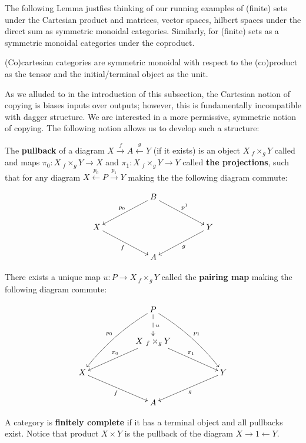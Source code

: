 The following Lemma justfies thinking of our running  examples of (finite) sets under the Cartesian product and matrices, vector spaces, hilbert spaces under the direct sum as symmetric monoidal categories.  Similarly, for (finite) sets as a symmetric monoidal categories under the coproduct.

\begin{lemma}
(Co)cartesian categories are symmetric monoidal with respect to the (co)product as the tensor and the initial/terminal object as the unit.
\end{lemma}




As we alluded to in the introduction of this subsection, the Cartesian notion of copying is biases inputs over outputs; however, this is fundamentally incompatible with dagger structure.  We are interested in a more permissive, symmetric notion of copying. The following notion allows us to develop such a structure:


\begin{definition}
The {\bf pullback} of a diagram  $X \xrightarrow{f} A \xleftarrow{g} Y$ (if it exists) is an object $X\ {}_f \times_{g} Y$ called and maps $\pi_0:X\ {}_f \times_{g} Y\to X$ and  $\pi_1:X\ {}_f \times_{g} Y\to Y$ called {\bf the  projections}, such that for any diagram $X \xleftarrow{p_0} P \xrightarrow{p_1} Y$ making the the following diagram commute:

$$
\xymatrix{
    &
    & B   \ar[dll]_{p_0} \ar[drr]^{p^1}
    &
    &
  \\X \ar[drr]_f 
    &
    & 
    &
    & Y  \ar[dll]^{g}
  \\
    &
    & A
    &
    & 
}
$$

There exists a unique map $u: P\to X\ {}_f\times_g Y $ called the {\bf pairing map} making the following diagram commute:

$$
\xymatrix{
    &
    & P \ar@/_/[ddll]_{p_0}  \ar@/^/[ddrr]^{p_1} \ar@{-->}[d]^{u}
    &
    &
  \\
    &
    & X\ {}_f \times_{g} Y  \ar[dll]_{\pi_0} \ar[drr]^{\pi_1}
    &
    &
  \\X \ar[drr]_f 
    &
    & 
    &
    & Y \ar[dll]^g 
  \\
    &
    & A
    &
    & 
}
$$

A category is {\bf finitely complete} if it has a terminal object and all pullbacks exist. Notice that product $X\times Y$ is the pullback of the diagram $X \rightarrow 1 \leftarrow Y$.
\end{definition}

